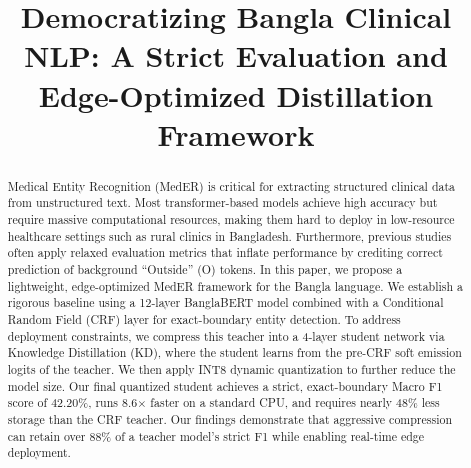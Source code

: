 \documentclass[conference]{IEEEtran}
\begin{document}
\title{Democratizing Bangla Clinical NLP: A Strict Evaluation and\\Edge-Optimized Distillation Framework}

\author{
\and
{}
\and
{}
}

\maketitle

\begin{abstract}
Medical Entity Recognition (MedER) is critical for extracting structured clinical data from unstructured text. Most transformer-based models achieve high accuracy but require massive computational resources, making them hard to deploy in low-resource healthcare settings such as rural clinics in Bangladesh. Furthermore, previous studies often apply relaxed evaluation metrics that inflate performance by crediting correct prediction of background ``Outside'' (O) tokens. In this paper, we propose a lightweight, edge-optimized MedER framework for the Bangla language. We establish a rigorous baseline using a 12-layer BanglaBERT model combined with a Conditional Random Field (CRF) layer for exact-boundary entity detection. To address deployment constraints, we compress this teacher into a 4-layer student network via Knowledge Distillation (KD), where the student learns from the pre-CRF soft emission logits of the teacher. We then apply INT8 dynamic quantization to further reduce the model size. Our final quantized student achieves a strict, exact-boundary Macro F1 score of 42.20\%, runs 8.6$\times$ faster on a standard CPU, and requires nearly 48\% less storage than the CRF teacher. Our findings demonstrate that aggressive compression can retain over 88\% of a teacher model's strict F1 while enabling real-time edge deployment.
\end{abstract}
\end{document}
